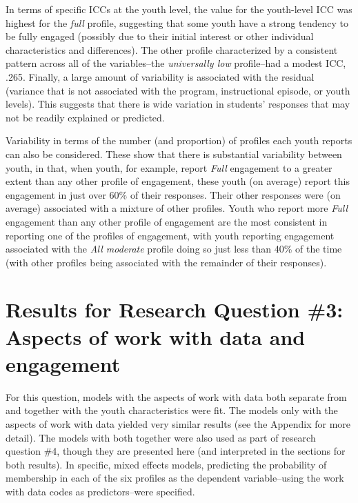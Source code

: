 \documentclass[]{book}
\theoremstyle{definition}
\theoremstyle{definition}
\theoremstyle{definition}
\theoremstyle{remark}
\begin{document}
In terms of specific ICCs at the youth level, the value for the
youth-level ICC was highest for the \emph{full} profile, suggesting that
some youth have a strong tendency to be fully engaged (possibly due to
their initial interest or other individual characteristics and
differences). The other profile characterized by a consistent pattern
across all of the variables--the \emph{universally low} profile--had a
modest ICC, .265. Finally, a large amount of variability is associated
with the residual (variance that is not associated with the program,
instructional episode, or youth levels). This suggests that there is
wide variation in students' responses that may not be readily explained
or predicted.

Variability in terms of the number (and proportion) of profiles each
youth reports can also be considered. These show that there is
substantial variability between youth, in that, when youth, for example,
report \emph{Full} engagement to a greater extent than any other profile
of engagement, these youth (on average) report this engagement in just
over 60\% of their responses. Their other responses were (on average)
associated with a mixture of other profiles. Youth who report more
\emph{Full} engagement than any other profile of engagement are the most
consistent in reporting one of the profiles of engagement, with youth
reporting engagement associated with the \emph{All moderate} profile
doing so just less than 40\% of the time (with other profiles being
associated with the remainder of their responses).

\section{Results for Research Question \#3: Aspects of work with data
and
engagement}\label{results-for-research-question-3-aspects-of-work-with-data-and-engagement}

For this question, models with the aspects of work with data both
separate from and together with the youth characteristics were fit. The
models only with the aspects of work with data yielded very similar
results (see the Appendix for more detail). The models with both
together were also used as part of research question \#4, though they
are presented here (and interpreted in the sections for both results).
In specific, mixed effects models, predicting the probability of
membership in each of the six profiles as the dependent variable--using
the work with data codes as predictors--were specified.
\end{document}
